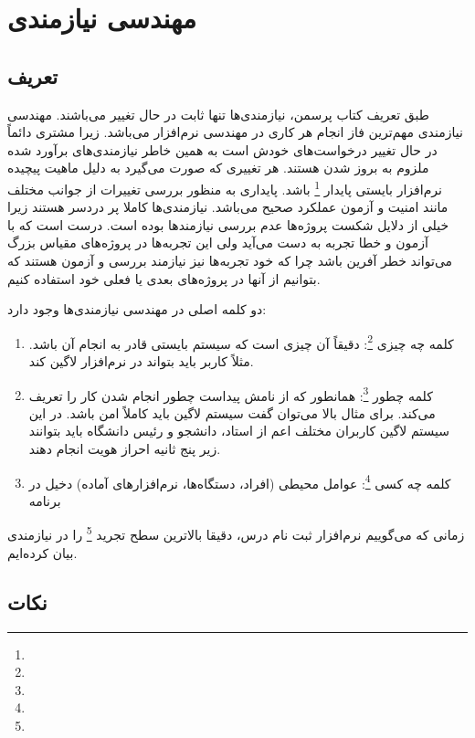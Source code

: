 \section{مهندسی نیازمندی}

\subsection{تعریف}

طبق تعریف کتاب پرسمن، نیازمندی‌ها تنها ثابت در حال تغییر می‌باشند. مهندسی
نیازمندی مهم‌ترین فاز انجام هر کاری در مهندسی نرم‌افزار می‌باشد. زیرا مشتری
دائماً در حال تغییر درخواست‌های خودش است به همین خاطر نیازمندی‌های برآورد شده
ملزوم به بروز شدن هستند. هر تغییری که صورت می‌گیرد به دلیل ماهیت پیچیده
نرم‌افزار بایستی پایدار \footnote{} باشد. پایداری به منظور بررسی
تغییرات از جوانب مختلف مانند امنیت و آزمون عملکرد صحیح می‌باشد. نیازمندی‌ها
کاملا پر دردسر هستند زیرا خیلی از دلایل شکست پروژه‌ها عدم بررسی نیازمند‌ها بوده
است. درست است که با آزمون و خطا تجربه به دست می‌آید ولی این تجربه‌ها در
پروژه‌های مقیاس بزرگ می‌تواند خطر آفرین باشد چرا که خود تجربه‌ها نیز نیازمند
بررسی و آزمون هستند که بتوانیم از آنها در پروژه‌های بعدی یا فعلی خود استفاده
کنیم.

دو کلمه اصلی در مهندسی نیازمندی‌ها وجود دارد:

\begin{enumerate}
  \item کلمه چه چیزی \footnote{}: دقیقاً‌ آن چیزی است که سیستم بایستی
  قادر به انجام آن باشد. مثلاً کاربر باید بتواند در نرم‌افزار لاگین کند.
  \item کلمه چطور \footnote{}: همانطور که از نامش پیداست چطور انجام شدن
  کار را تعریف می‌کند. برای مثال بالا می‌توان گفت سیستم لاگین باید کاملاً امن
  باشد. در این سیستم لاگین کاربران مختلف اعم از استاد، دانشجو و رئیس دانشگاه
  باید بتوانند زیر پنج ثانیه احراز هویت انجام دهند.
  \item کلمه چه کسی \footnote{}: عوامل محیطی (افراد، دستگاه‌ها،
  نرم‌افزار‌های آماده) دخیل در برنامه
\end{enumerate}

زمانی که می‌گوییم نرم‌افزار ثبت نام درس، دقیقا بالاترین سطح تجرید
\footnote{} را در نیازمندی بیان کرده‌ایم.

\subsection*{نکات}


